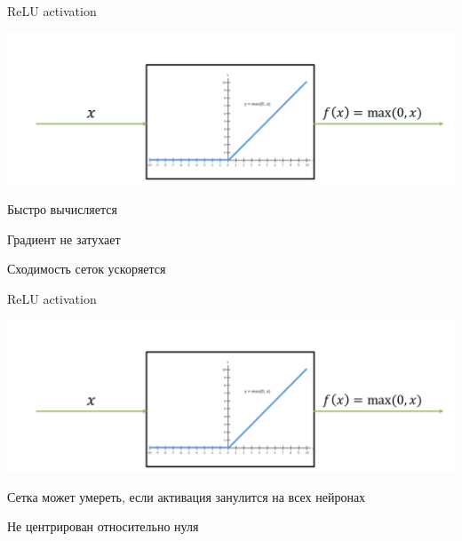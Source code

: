 \documentclass[notes,12pt, aspectratio=169]{beamer}
\begin{document}
\begin{frame}{ReLU activation}
\begin{center}
\includegraphics[width=.8\linewidth]{relu_activation.png}
\end{center}

\begin{itemize}
{ \color{green} 
\item  Быстро вычисляется 

\item  Градиент не затухает

\item  Сходимость сеток ускоряется 
} 
\end{itemize}
\end{frame}


\begin{frame}{ReLU activation}
\begin{center}
\includegraphics[width=.8\linewidth]{relu_activation.png}
\end{center}

\begin{itemize}
{ \color{red} 
\item  Сетка может умереть, если активация занулится на всех нейронах

\item  Не центрирован относительно нуля
} 
\end{itemize}
\end{frame}
\end{document}
